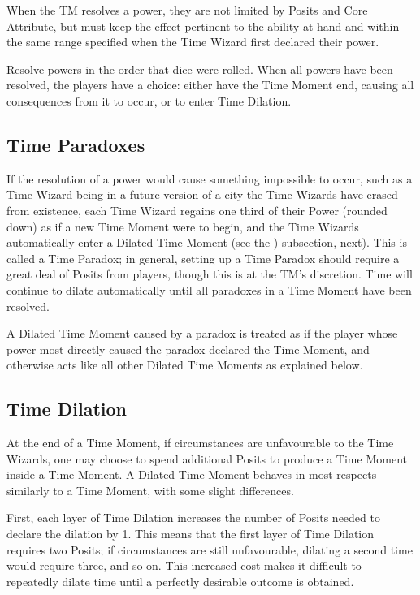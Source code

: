 \documentclass{article}
\begin{document}
When the TM resolves a power, they are not limited by Posits and Core Attribute, but must keep
the effect pertinent to the ability at hand and within the same range specified when the Time
Wizard first declared their power.

Resolve powers in the order that dice were rolled. When all powers have been resolved, the
players have a choice: either have the Time Moment end, causing all consequences from it to
occur, or to enter Time Dilation.

\subsection{Time Paradoxes} \label{ssec:time-paradox}
If the resolution of a power would cause something impossible to occur, such as a Time Wizard
being in a future version of a city the Time Wizards have erased from existence, each Time
Wizard regains one third of their Power (rounded down) as if a new Time Moment were to begin,
and the Time Wizards automatically enter a Dilated Time Moment (see the
) subsection, next). This is called a Time Paradox; in general,
setting up a Time Paradox should require a great deal of Posits from players, though this is at
the TM's discretion. Time will continue to dilate automatically until all paradoxes in a Time
Moment have been resolved.

A Dilated Time Moment caused by a paradox is treated as if the player whose power most directly
caused the paradox declared the Time Moment, and otherwise acts like all other Dilated Time
Moments as explained below.

\subsection{Time Dilation} \label{ssec:time-dilation}
At the end of a Time Moment, if circumstances are unfavourable to the Time Wizards, one may
choose to spend additional Posits to produce a Time Moment inside a Time Moment. A Dilated Time
Moment behaves in most respects similarly to a Time Moment, with some slight differences.

First, each layer of Time Dilation increases the number of Posits needed to declare the dilation
by 1. This means that the first layer of Time Dilation requires two Posits; if circumstances are
still unfavourable, dilating a second time would require three, and so on. This increased cost
makes it difficult to repeatedly dilate time until a perfectly desirable outcome is obtained.
\end{document}

